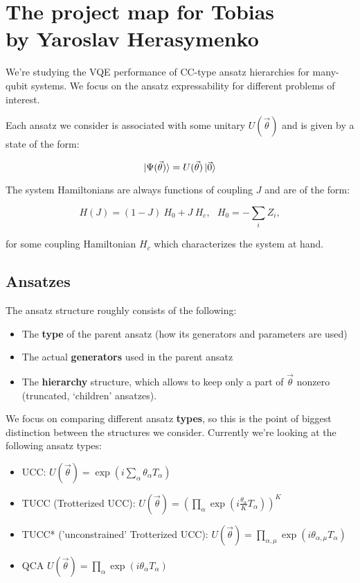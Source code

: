 \documentclass[10pt, a4paper]{article}
\begin{document}
\section*{The project map for Tobias\\
\small{by Yaroslav Herasymenko}}

We're studying the VQE performance of CC-type ansatz hierarchies for many-qubit systems. We focus on the ansatz expressability for different problems of interest. 

Each ansatz we consider is associated with some unitary $U(\vec{\theta})$ and is given by a state of the form:

\begin{equation*}
\ket{\Psi(\vec{\theta})}=U(\vec{\theta})\ket{\vec{0}}
\end{equation*}

The system Hamiltonians are always functions of coupling $J$ and are of the form:

\begin{equation}
H(J)=(1-J)~H_0+J~H_c,~~~H_0=-\sum_i Z_i,
\end{equation}

for some coupling Hamiltonian $H_c$ which characterizes the system at hand.

\subsection*{Ansatzes}

The ansatz structure roughly consists of the following:

\begin{itemize}
\item The \textbf{type} of the parent ansatz (how its generators and parameters are used)
\item The actual \textbf{generators} used in the parent ansatz
\item The \textbf{hierarchy} structure, which allows to keep only a part of $\vec{\theta}$ nonzero (truncated, `children' ansatzes).
\end{itemize}

We focus on comparing different ansatz \textbf{types}, so this is the point of biggest distinction between the structures we consider. Currently we're looking at the following ansatz types:

\begin{itemize}
\item UCC: $U(\vec{\theta})=\exp(i\sum_{\alpha}\theta_{\alpha}T_\alpha)$
\item TUCC (Trotterized UCC): $U(\vec{\theta})=(\prod_{\alpha}\exp(i\frac{\theta_{\alpha}}{K}T_\alpha))^K$
\item TUCC* ('unconstrained' Trotterized UCC): $U(\vec{\theta})=\prod_{\alpha,\mu}\exp(i\theta_{\alpha,\mu}T_\alpha)$
\item QCA $U(\vec{\theta})=\prod_{\alpha}\exp(i\theta_{\alpha}T_\alpha)$
\end{itemize}
\end{document}
